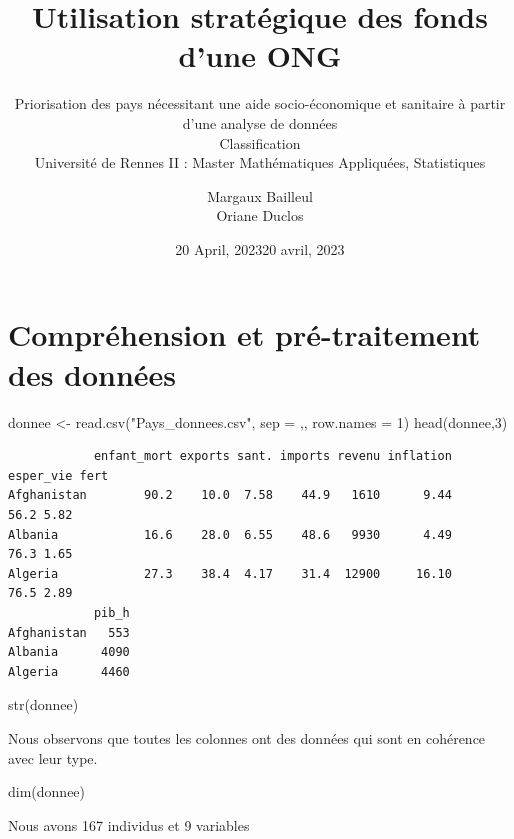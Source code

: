 \documentclass[
]{article}
\title{Utilisation stratégique des fonds d'une ONG}
\subtitle{Priorisation des pays nécessitant une aide socio-économique et
sanitaire à partir d'une analyse de données\\
Classification\\
Université de Rennes II : Master Mathématiques Appliquées, Statistiques}
\author{Margaux Bailleul\\
Oriane Duclos}
\date{20 April, 2023}
\date{20 avril, 2023}
\newenvironment{Shaded}{}{}
\newcommand{\AttributeTok}[1]{#1}
\newcommand{\DecValTok}[1]{#1}
\newcommand{\FunctionTok}[1]{#1}
\newcommand{\NormalTok}[1]{#1}
\newcommand{\OtherTok}[1]{\textcolor[rgb]{1.00,0.25,0.00}{#1}}
\newcommand{\StringTok}[1]{\textcolor[rgb]{0.00,0.50,0.50}{#1}}
\begin{document}
\maketitle

{
\setcounter{tocdepth}{2}
\tableofcontents
}
\hypertarget{compruxe9hension-et-pruxe9-traitement-des-donnuxe9es}{%
\section{Compréhension et pré-traitement des
données}\label{compruxe9hension-et-pruxe9-traitement-des-donnuxe9es}}

\begin{Shaded}
\begin{Highlighting}[]
\NormalTok{donnee }\OtherTok{\textless{}{-}} \FunctionTok{read.csv}\NormalTok{(}\StringTok{"Pays\_donnees.csv"}\NormalTok{, }\AttributeTok{sep =} \StringTok{\textquotesingle{},\textquotesingle{}}\NormalTok{, }\AttributeTok{row.names =} \DecValTok{1}\NormalTok{)}
\FunctionTok{head}\NormalTok{(donnee,}\DecValTok{3}\NormalTok{)}
\end{Highlighting}
\end{Shaded}

\begin{verbatim}
            enfant_mort exports sant. imports revenu inflation esper_vie fert
Afghanistan        90.2    10.0  7.58    44.9   1610      9.44      56.2 5.82
Albania            16.6    28.0  6.55    48.6   9930      4.49      76.3 1.65
Algeria            27.3    38.4  4.17    31.4  12900     16.10      76.5 2.89
            pib_h
Afghanistan   553
Albania      4090
Algeria      4460
\end{verbatim}

\begin{Shaded}
\begin{Highlighting}[]
\FunctionTok{str}\NormalTok{(donnee)}
\end{Highlighting}
\end{Shaded}

Nous observons que toutes les colonnes ont des données qui sont en
cohérence avec leur type.

\begin{Shaded}
\begin{Highlighting}[]
\FunctionTok{dim}\NormalTok{(donnee)}
\end{Highlighting}
\end{Shaded}

Nous avons 167 individus et 9 variables
\end{document}
